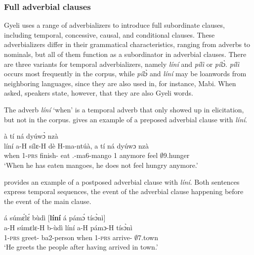 \subsubsection{Full adverbial clauses}
\label{sec:ADVfull}

Gyeli uses a range of adverbializers to introduce full subordinate clauses, including temporal, concessive, causal, and conditional clauses. These adverbializers differ in their grammatical characteristics, ranging from adverbs to nominals, but all of them function as a subordinator in adverbial clauses.
There are three variants for temporal adverbializers, namely {\itshape líní} and {\itshape pílì} or {\itshape pílɔ̀}. {\itshape pílì} occurs most frequently in the corpus, while {\itshape pílɔ̀} and {\itshape líní} may be loanwords from neighboring languages, since they are also used in, for instance, Mabi. When asked, speakers state, however, that they are also Gyeli words.


The adverb {\itshape líní} `when' is a temporal adverb that only showed up in elicitation, but not in the corpus.  gives an example of a preposed adverbial clause with {\itshape líní}.



\ea\label{lini1x}
  \textsubscript{{\ADV}} à tí ná dyúwɔ̀ nzà \\
{\db}líní a-H sílɛ-H dè H-ma-ntúà, a tí ná dyúwɔ nzà  \\
{\db}when 1-\textsc{prs} finish-{\R} eat {\OBJ}.{\LINK}-ma6-mango 1 {\NEG} anymore feel $\emptyset$9.hunger\\
    \trans `When he has eaten mangoes, he does not feel hungry anymore.'
\z

\noindent {} provides an example of a postposed adverbial clause with {\itshape líní}. Both sentences express temporal sequences, the event of the adverbial clause happening before the event of the main clause.


\ea\label{lini2x}
  \glll     á súmɛ́lɛ́ bùdì [{\bfseries líní} á pámɔ́ tísɔ̀nì]\textsubscript{{\ADV}} \\
            a-H súmɛlɛ-H b-ùdì {\db}líní a-H pámɔ-H tísɔ̀nì  \\
            1-\textsc{prs} greet-{\R} ba2-person {\db}when 1-\textsc{prs} arrive-{\R} $\emptyset$7.town \\
    \trans `He greets the people after having arrived in town.'
\z





